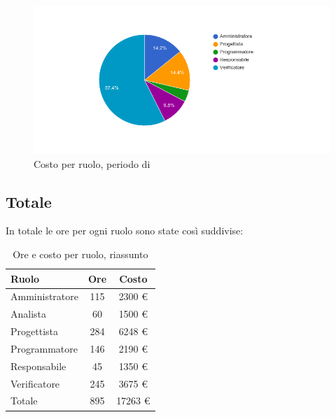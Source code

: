 \begin{figure}[H]
  \begin{center}
    \includegraphics[width=15cm]{res/img/prospettoEconomico/costoPerRuoloValidazione.png}
  \caption{Costo per ruolo, periodo di }
  \end{center} 
\end{figure}  


\subsection{Totale}
In totale le ore per ogni ruolo sono state così suddivise:

\begin{table}[H]
	\centering
	\begin{tabular}{ l c c }
		\textbf{Ruolo} & \textbf{Ore} & \textbf{Costo} \\
		\hline
		Amministratore & 115 & 2300 \euro{} \\
		Analista & 60 & 1500 \euro{} \\
		Progettista & 284 & 6248 \euro{} \\
		Programmatore & 146 & 2190 \euro{} \\
		Responsabile & 45 & 1350 \euro{} \\
		Verificatore & 245 & 3675 \euro{} \\
		\hline
		Totale & 895 & 17263 \euro{} \\
		\hline
	\end{tabular}
	\caption{Ore e costo per ruolo, riassunto }
\end{table}

